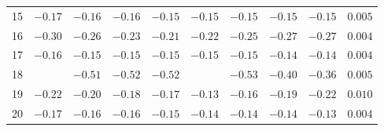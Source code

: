 \begin{tabular}{@{}l cccc cccc r@{}}
15 & $-0.17$ & $-0.16$ & $-0.16$ & $-0.15$ & $-0.15$ & $-0.15$ & $-0.15$ & $-0.15$ & $0.005$ \\
16 & $-0.30$ & $-0.26$ & $-0.23$ & $-0.21$ & $-0.22$ & $-0.25$ & $-0.27$ & $-0.27$ & $0.004$ \\
17 & $-0.16$ & $-0.15$ & $-0.15$ & $-0.15$ & $-0.15$ & $-0.15$ & $-0.14$ & $-0.14$ & $0.004$ \\
\cmidrule{1-10}
18 &         & $-0.51$ & $-0.52$ & $-0.52$ &         & $-0.53$ & $-0.40$ & $-0.36$ & $0.005$ \\
19 & $-0.22$ & $-0.20$ & $-0.18$ & $-0.17$ & $-0.13$ & $-0.16$ & $-0.19$ & $-0.22$ & $0.010$ \\
20 & $-0.17$ & $-0.16$ & $-0.16$ & $-0.15$ & $-0.14$ & $-0.14$ & $-0.14$ & $-0.13$ & $0.004$ \\
\bottomrule
\end{tabular}
